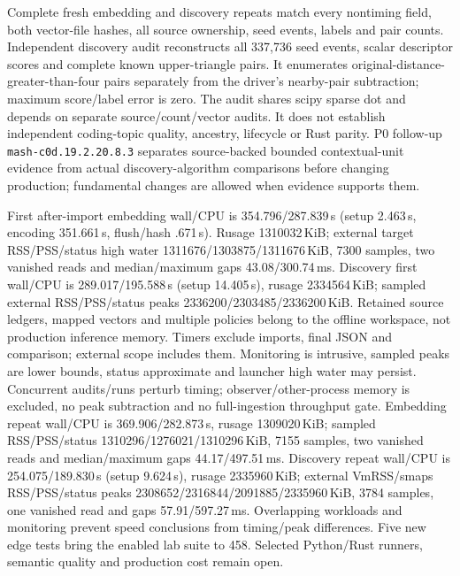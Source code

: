 \documentclass[11pt]{article}
\begin{document}
Complete fresh embedding and discovery repeats match every nontiming field,
both vector-file hashes, all source ownership, seed events, labels and pair
counts. Independent discovery audit reconstructs all 337,736 seed events,
scalar descriptor scores and complete known upper-triangle pairs. It enumerates
original-distance-greater-than-four pairs separately from the driver's
nearby-pair subtraction; maximum score/label error is zero. The audit shares
scipy sparse dot and depends on separate source/count/vector audits. It does
not establish independent coding-topic quality, ancestry, lifecycle or Rust
parity. P0 follow-up \texttt{mash-c0d.19.2.20.8.3} separates source-backed bounded
contextual-unit evidence from actual discovery-algorithm comparisons before
changing production; fundamental changes are allowed when evidence supports them.

First after-import embedding wall/CPU is 354.796/287.839\,s (setup 2.463\,s,
encoding 351.661\,s, flush/hash .671\,s). Rusage 1310032\,KiB; external target
RSS/PSS/status high water 1311676/1303875/1311676\,KiB, 7300 samples, two vanished
reads and median/maximum gaps 43.08/300.74\,ms. Discovery first wall/CPU is
289.017/195.588\,s (setup 14.405\,s), rusage 2334564\,KiB; sampled external
RSS/PSS/status peaks 2336200/2303485/2336200\,KiB. Retained source ledgers,
mapped vectors and multiple policies belong to the offline workspace, not
production inference memory. Timers exclude imports, final JSON and comparison;
external scope includes them. Monitoring is intrusive, sampled peaks are lower
bounds, status approximate and launcher high water may persist. Concurrent
audits/runs perturb timing; observer/other-process memory is excluded, no peak
subtraction and no full-ingestion throughput gate. Embedding repeat wall/CPU is
369.906/282.873\,s, rusage 1309020\,KiB; sampled RSS/PSS/status
1310296/1276021/1310296\,KiB, 7155 samples, two vanished reads and median/maximum
gaps 44.17/497.51\,ms. Discovery repeat wall/CPU is 254.075/189.830\,s (setup
9.624\,s), rusage 2335960\,KiB; external VmRSS/smaps RSS/PSS/status peaks
2308652/2316844/2091885/2335960\,KiB, 3784 samples, one vanished read and gaps
57.91/597.27\,ms. Overlapping workloads and monitoring prevent speed conclusions
from timing/peak differences. Five new edge tests bring the enabled lab suite to
458. Selected Python/Rust runners, semantic quality and production cost remain open.
\end{document}
